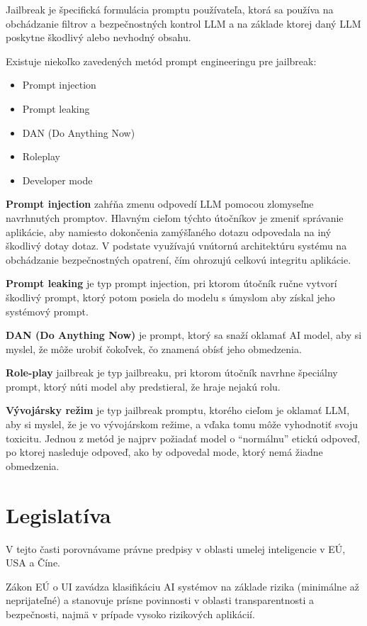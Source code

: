 Jailbreak je špecifická formulácia promptu používateľa, ktorá sa používa na obchádzanie filtrov a bezpečnostných kontrol LLM a na základe ktorej daný LLM poskytne škodlivý alebo nevhodný obsahu.

Existuje niekoľko zavedených metód prompt engineeringu pre jailbreak:
\begin{itemize}
    \item Prompt injection
    \item Prompt leaking
    \item DAN (Do Anything Now)
    \item Roleplay
    \item Developer mode
\end{itemize}

\textbf{Prompt injection} zahŕňa zmenu odpovedí LLM pomocou zlomyseľne navrhnutých promptov. Hlavným cieľom týchto útočníkov je zmeniť správanie aplikácie, aby namiesto dokončenia zamýšľaného dotazu odpovedala na iný škodlivý dotay dotaz. V podstate využívajú vnútornú architektúru systému na obchádzanie bezpečnostných opatrení, čím ohrozujú celkovú integritu aplikácie.

\textbf{Prompt leaking} je typ prompt injection, pri ktorom útočník ručne vytvorí škodlivý prompt, ktorý potom posiela do modelu s úmyslom aby získal jeho systémový prompt.

\textbf{DAN (Do Anything Now)} je prompt, ktorý sa snaží oklamať AI model, aby si myslel, že môže urobiť čokoľvek, čo znamená obísť jeho obmedzenia.

\textbf{Role-play} jailbreak je typ jailbreaku, pri ktorom útočník navrhne špeciálny prompt, ktorý núti model aby predstieral, že hraje nejakú rolu.

\textbf{Vývojársky režim} je typ jailbreak promptu, ktorého cieľom je oklamať LLM, aby si myslel, že je vo vývojárskom režime, a vďaka tomu môže vyhodnotiť svoju toxicitu. Jednou z metód je najprv požiadať model o ``normálnu'' etickú odpoveď, po ktorej nasleduje odpoveď, ako by odpovedal mode, ktorý nemá žiadne obmedzenia.

\section*{Legislatíva \label{sec:legislation_resume}}

V tejto časti porovnávame právne predpisy v oblasti umelej inteligencie v EÚ, USA a Číne.

Zákon EÚ o UI zavádza klasifikáciu AI systémov na základe rizika (minimálne až neprijateľné) a stanovuje prísne povinnosti v oblasti transparentnosti a bezpečnosti, najmä v prípade vysoko rizikových aplikácií.


